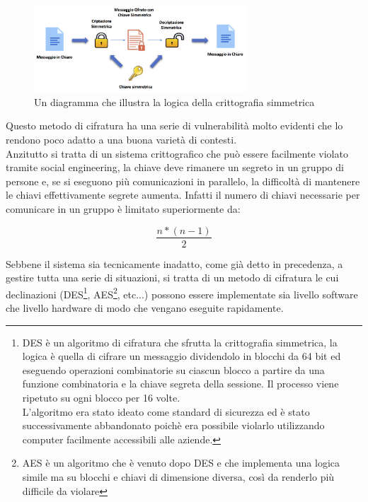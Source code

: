 \begin{figure}[h]
    \centering
    \includegraphics[width=300px]{./images/criptazione_simmetrica.png}
    \caption{Un diagramma che illustra la logica della crittografia simmetrica}
    \label{fig:symmetricalCryptography}
\end{figure}

Questo metodo di cifratura ha una serie di vulnerabilità molto evidenti che lo rendono poco adatto a una buona varietà di contesti.
\\
Anzitutto si tratta di un sistema crittografico che può essere facilmente violato tramite social engineering, la chiave deve rimanere un segreto in un gruppo di persone e, se si eseguono più comunicazioni in parallelo, la difficoltà di mantenere le chiavi effettivamente segrete aumenta. Infatti il numero di chiavi necessarie per comunicare in un gruppo è limitato superiormente da\cite{Anderson2008}:

\begin{equation}
    \frac{n * (n - 1)}{2}
\end{equation}

Sebbene il sistema sia tecnicamente inadatto, come già detto in precedenza, a gestire tutta una serie di situazioni, si tratta di un metodo di cifratura le cui declinazioni (DES\footnote{
DES è un algoritmo di cifratura che sfrutta la crittografia simmetrica, la logica è quella di cifrare un messaggio dividendolo in blocchi da 64 bit ed eseguendo operazioni combinatorie su ciascun blocco a partire da una funzione combinatoria e la chiave segreta della sessione. Il processo viene ripetuto su ogni blocco per 16 volte.
\\
L'algoritmo era stato ideato come standard di sicurezza ed è stato successivamente abbandonato poichè era possibile violarlo utilizzando computer facilmente accessibili alle aziende.
}, AES\footnote{
AES è un algoritmo che è venuto dopo DES e che implementa una logica simile ma su blocchi e chiavi di dimensione diversa, così da renderlo più difficile da violare
}, etc...) possono essere implementate sia livello software che livello hardware di modo che vengano eseguite rapidamente.

